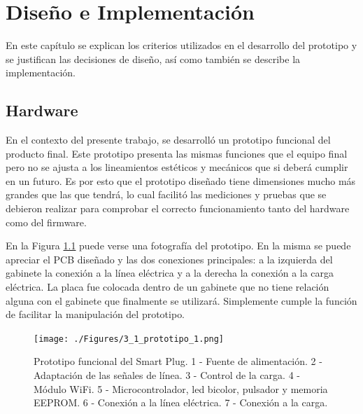 \chapter{Diseño e Implementación} %

\label{Chapter3} %


En este capítulo se explican los criterios utilizados en el desarrollo del prototipo y se justifican las decisiones de diseño, así como también se describe la implementación.

\section{Hardware}
\label{section:hardware}

En el contexto del presente trabajo, se desarrolló un prototipo funcional del producto final. Este prototipo presenta las mismas funciones que el equipo final pero no se ajusta a los lineamientos estéticos y mecánicos que si deberá cumplir en un futuro. Es por esto que el prototipo diseñado tiene dimensiones mucho más grandes que las que tendrá, lo cual facilitó las mediciones y pruebas que se debieron realizar para comprobar el correcto funcionamiento tanto del hardware como del firmware. 

En la Figura \ref{fig:prototipo} puede verse una fotografía del prototipo. En la misma se puede apreciar el PCB diseñado y las dos conexiones principales: a la izquierda del gabinete la conexión a la línea eléctrica y a la derecha la conexión a la carga eléctrica. La placa fue colocada dentro de un gabinete que no tiene relación alguna con el gabinete que finalmente se utilizará. Simplemente cumple la función de facilitar la manipulación del prototipo.

\begin{figure}[h]
	\centering
	\texttt{[image: ./Figures/3\_1\_prototipo\_1.png]}
	\caption{Prototipo funcional del Smart Plug. 1 - Fuente de alimentación. 2 - Adaptación de las señales de línea. 3 - Control de la carga. 4 - Módulo WiFi. 5 - Microcontrolador, led bicolor, pulsador y memoria EEPROM. 6 - Conexión a la línea eléctrica. 7 - Conexión a la carga.}
	\label{fig:prototipo}
\end{figure}

